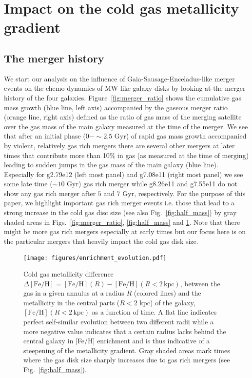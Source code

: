 \documentclass[useAMS,usenatbib]{mnras}
\begin{document}
\section{Impact on the cold gas metallicity gradient} \label{sec:results-gradient}

\subsection{The merger history} \label{sec:mergerhist}

We start our analysis on the influence of Gaia-Sausage-Enceladus-like merger
events on the chemo-dynamics of MW-like galaxy disks by looking at the merger history of the four galaxies. Figure~\ref{fig:merger_ratio} shows the cumulative gas mass growth (blue line, left axis) accompanied by the gaseous merger ratio (orange line, right axis) defined as the ratio of gas mass of the merging satellite over the gas mass of the main galaxy measured at the time of the merger. We see that after an initial phase ($0-\sim2.5$ Gyr) of rapid gas mass growth accompanied by violent, relatively gas rich mergers there are several other mergers at later times that contribute more than 10\% in gas (as measured at the time of merging) leading to sudden jumps in the gas mass of the main galaxy (blue line). 
Especially for g2.79e12 (left most panel) and g7.08e11 (right most panel) we see some late time ($\sim10$ Gyr) gas rich merger while g8.26e11 and g7.55e11 do not show any gas rich merger after $5$ and $7$ Gyr, respectively. For the purpose of this paper, we highlight important gas rich merger events i.e. those that lead to a strong increase in the cold gas disc size (see also Fig.~\ref{fig:half_mass}) by gray shaded areas in Figs.~\ref{fig:merger_ratio}, \ref{fig:half_mass} and \ref{fig:feh_evolution}. Note that there might be more gas rich mergers especially at early times but our focus here is on the particular mergers that heavily impact the cold gas disk size.

\begin{figure}
    \begin{centering}
        \texttt{[image: figures/enrichment\_evolution.pdf]}
        \vspace*{-1.75em}
        \caption{
            Cold gas metallicity difference $\Delta\mathrm{[Fe/H]}=\mathrm{[Fe/H]}(R)-\mathrm{[Fe/H]}(R<2\, \mathrm{kpc})$, between the gas in a given annulus at a radius $R$ (colored lines) and the metallicity in the central parts ($R<2$ kpc) of the galaxy, $\mathrm{[Fe/H]}(R<2\, \mathrm{kpc})$ as a function of time. A flat line indicates perfect self-similar evolution between two different radii while a more negative value indicates that a certain radius lacks behind the central galaxy in [Fe/H] enrichment and is thus indicative of a steepening of the metallicity gradient. Gray shaded areas mark times where the gas disk size sharply increases due to gas rich mergers (see Fig.~\ref{fig:half_mass}).
        }
        \label{fig:feh_evolution}
    \end{centering}
\end{figure}
\end{document}
